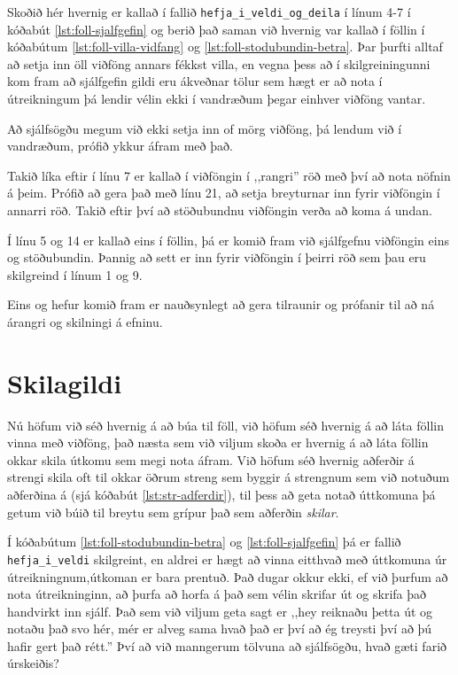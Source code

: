 Skoðið hér hvernig er kallað í fallið \texttt{hefja\_i\_veldi\_og\_deila} í línum 4-7 í kóðabút \ref{lst:foll-sjalfgefin} og berið það saman við hvernig var kallað í föllin í kóðabútum \ref{lst:foll-villa-vidfang} og \ref{lst:foll-stodubundin-betra}.
Þar þurfti alltaf að setja inn öll viðföng annars fékkst villa, en vegna þess að í  skilgreiningunni kom fram að sjálfgefin gildi eru ákveðnar tölur sem hægt er að nota í útreikningum þá lendir vélin ekki í vandræðum þegar einhver viðföng vantar.

Að sjálfsögðu megum við ekki setja inn of mörg viðföng, þá lendum við í vandræðum, prófið ykkur áfram með það.

Takið líka eftir í línu 7 er kallað í viðföngin í ,,rangri'' röð með því að nota nöfnin á þeim.
Prófið að gera það með línu 21, að setja breyturnar inn fyrir viðföngin í annarri röð.
Takið eftir því að stöðubundnu viðföngin verða að koma á undan.

Í línu 5 og 14 er kallað eins í föllin, þá er komið fram við sjálfgefnu viðföngin eins og stöðubundin.
Þannig að sett er inn fyrir viðföngin í þeirri röð sem þau eru skilgreind í línum 1 og 9.

Eins og hefur komið fram er nauðsynlegt að gera tilraunir og prófanir til að ná árangri og skilningi á efninu.


\section{Skilagildi}\label{uk:skilagildi}
Nú höfum við séð hvernig á að búa til föll, við höfum séð hvernig á að láta föllin vinna með viðföng, það næsta sem við viljum skoða er hvernig á að láta föllin okkar skila útkomu sem megi nota áfram.
Við höfum séð hvernig aðferðir á strengi skila oft til okkar öðrum streng sem byggir á strengnum sem við notuðum aðferðina á (sjá kóðabút \ref{lst:str-adferdir}), til þess að geta notað úttkomuna þá getum við búið til breytu sem grípur það sem aðferðin \textit{skilar}.

Í kóðabútum \ref{lst:foll-stodubundin-betra} og \ref{lst:foll-sjalfgefin} þá er fallið \texttt{hefja\_i\_veldi} skilgreint, en aldrei er hægt að vinna eitthvað með úttkomuna úr útreikningnum,útkoman er bara prentuð.
Það dugar okkur ekki, ef við þurfum að nota útreikninginn, að þurfa að horfa á það sem vélin skrifar út og skrifa það handvirkt inn sjálf.
Það sem við viljum geta sagt er ,,hey reiknaðu þetta út og notaðu það svo hér, mér er alveg sama hvað það er því að ég treysti því að þú hafir gert það rétt.''
Því að við manngerum tölvuna að sjálfsögðu, hvað gæti farið úrskeiðis?

